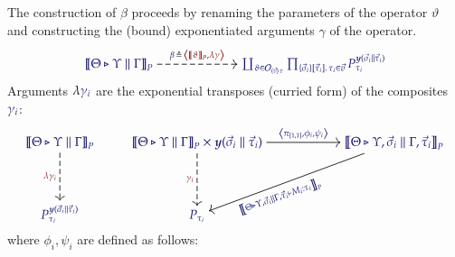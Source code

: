 The construction of $\beta$ proceeds by renaming the parameters of the operator
$\vartheta$ and constructing the (bound) exponentiated arguments $\gamma$ of the
operator.
\[
  \begin{tikzcd}[cramped, ampersand replacement = \&]
    {\IMode{
      {\SemBrackets{
        \Theta\triangleright\Upsilon\parallel\Gamma
      }}_{P}
    }}
      \arrow[
        , r
        , dashed
        , "
          \Define{
            \beta\,
          }{
            \,\Tuple{
              \SemBrackets{\vartheta}_P, \lambda\gamma
            }
          }
          "
      ]
\&[4.0em]
    {\IMode{
      \coprod_{
        \vartheta\in \Operators_{\MkArity{\vec{v}}{\tau}}
      }
      \prod_{
        \MkValence{\vec{\sigma}_i}{\vec{\tau}_i}{\tau_i}\in\vec{v}
      }
      P_{\tau_i}^{\Yoneda{\vec{\sigma}_i\parallel\vec{\tau}_i}}
    }}
  \end{tikzcd}
\]
Arguments $\lambda\IMode{{\gamma}_{i}}$ are the exponential transposes (curried
form) of the composites $\IMode{{\gamma}_{i}}$:
\[
  \begin{tikzcd}[cramped, ampersand replacement = \&]
    {\IMode{
      {\SemBrackets{
        \Theta\triangleright\Upsilon\parallel\Gamma
      }}_{P}
    }}
      \arrow[
        , dashed
        , d
        , swap
        , "\OMode{\lambda{\gamma}_{i}}"
      ]
\&
    {\IMode{
      {\SemBrackets{
        \Theta\triangleright\Upsilon\parallel\Gamma
      }}_{P}
      \times
      \Yoneda{
        \vec{\sigma}_{i}\parallel\vec{\tau}_{i}}
      }
    }
      \arrow[
        , r
        , "
          \IMode{
            \Tuple{
              {\pi}_{[1,1]},
              {\phi}_{i},
              {\psi}_{i}
            }
          }
          "
        ]
      \arrow[
        , dashed
        , d
        , swap
        , "\OMode{{\gamma}_{i}}"
      ]
\&[3.5em]
    {\IMode{
      \SemBrackets{
        \Theta\triangleright\Upsilon,
        \vec{\sigma}_i\parallel\Gamma,
        \vec{\tau}_{i}
      }_{P}
    }}
      \ar{dl}[
        , rotate = +19.25
        , xshift = -4.5em
        , yshift = -0.2em
      ]{\IMode{\SemBrackets{\Theta\triangleright\Upsilon,\vec{\sigma}_{i}\parallel\Gamma,\vec{\tau}_{i}\vdash M_i:\tau_i}_P}}
\\[2.0em]
    {\IMode{{P}_{{\tau}_{i}}^{\Yoneda{\vec{\sigma}_{i}\parallel\vec{\tau}_{i}}}}}
\&
    {\IMode{P_{{\tau}_{i}}}}
\&
  \end{tikzcd}
\]
where $\phi_i,\psi_i$ are defined as follows:
